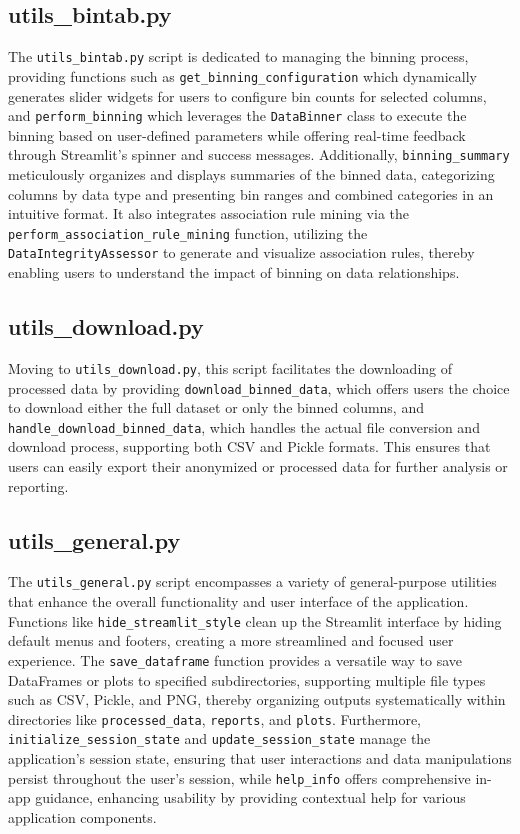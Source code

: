 \documentclass{article}
\begin{document}
\subsection*{utils\_bintab.py}
The \texttt{utils\_bintab.py} script is dedicated to managing the binning process, providing functions such as \texttt{get\_binning\_configuration} which dynamically generates slider widgets for users to configure bin counts for selected columns, and \texttt{perform\_binning} which leverages the \texttt{DataBinner} class to execute the binning based on user-defined parameters while offering real-time feedback through Streamlit’s spinner and success messages. Additionally, \texttt{binning\_summary} meticulously organizes and displays summaries of the binned data, categorizing columns by data type and presenting bin ranges and combined categories in an intuitive format. It also integrates association rule mining via the \texttt{perform\_association\_rule\_mining} function, utilizing the \texttt{DataIntegrityAssessor} to generate and visualize association rules, thereby enabling users to understand the impact of binning on data relationships.

\subsection*{utils\_download.py}
Moving to \texttt{utils\_download.py}, this script facilitates the downloading of processed data by providing \texttt{download\_binned\_data}, which offers users the choice to download either the full dataset or only the binned columns, and \texttt{handle\_download\_binned\_data}, which handles the actual file conversion and download process, supporting both CSV and Pickle formats. This ensures that users can easily export their anonymized or processed data for further analysis or reporting.

\subsection*{utils\_general.py}
The \texttt{utils\_general.py} script encompasses a variety of general-purpose utilities that enhance the overall functionality and user interface of the application. Functions like \texttt{hide\_streamlit\_style} clean up the Streamlit interface by hiding default menus and footers, creating a more streamlined and focused user experience. The \texttt{save\_dataframe} function provides a versatile way to save DataFrames or plots to specified subdirectories, supporting multiple file types such as CSV, Pickle, and PNG, thereby organizing outputs systematically within directories like \texttt{processed\_data}, \texttt{reports}, and \texttt{plots}. Furthermore, \texttt{initialize\_session\_state} and \texttt{update\_session\_state} manage the application's session state, ensuring that user interactions and data manipulations persist throughout the user’s session, while \texttt{help\_info} offers comprehensive in-app guidance, enhancing usability by providing contextual help for various application components.
\end{document}
